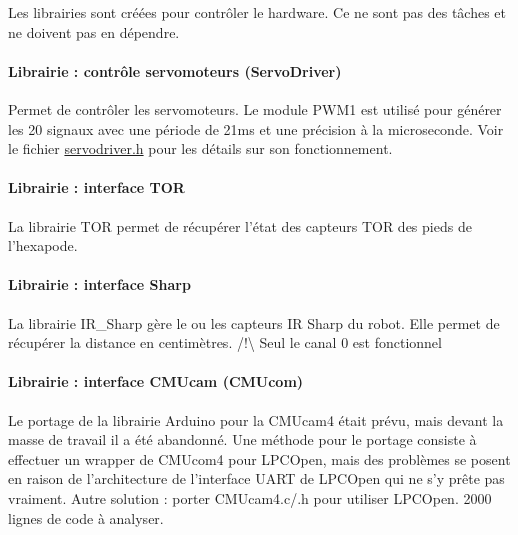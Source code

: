 Les librairies sont créées pour contrôler le hardware. Ce ne sont pas des tâches et ne doivent pas en dépendre.

\paragraph*{Librairie \-: contrôle servomoteurs (Servo\-Driver)}

Permet de contrôler les servomoteurs. Le module P\-W\-M1 est utilisé pour générer les 20 signaux avec une période de 21ms et une précision à la microseconde. Voir le fichier \hyperlink{servodriver_8h}{servodriver.\-h} pour les détails sur son fonctionnement.

\paragraph*{Librairie \-: interface T\-O\-R}

La librairie T\-O\-R permet de récupérer l'état des capteurs T\-O\-R des pieds de l'hexapode.

\paragraph*{Librairie \-: interface Sharp}

La librairie I\-R\-\_\-\-Sharp gère le ou les capteurs I\-R Sharp du robot. Elle permet de récupérer la distance en centimètres. /!\textbackslash{} Seul le canal 0 est fonctionnel

\paragraph*{Librairie \-: interface C\-M\-Ucam (C\-M\-Ucom)}

Le portage de la librairie Arduino pour la C\-M\-Ucam4 était prévu, mais devant la masse de travail il a été abandonné. Une méthode pour le portage consiste à effectuer un wrapper de C\-M\-Ucom4 pour L\-P\-C\-Open, mais des problèmes se posent en raison de l'architecture de l'interface U\-A\-R\-T de L\-P\-C\-Open qui ne s'y prête pas vraiment. Autre solution \-: porter C\-M\-Ucam4.\-c/.h pour utiliser L\-P\-C\-Open. 2000 lignes de code à analyser. 